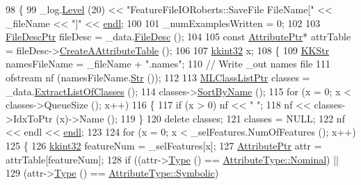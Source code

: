 \begin{DoxyCode}
98 \{
99   \_log.\hyperlink{class_k_k_b_1_1_run_log_a32cf761d7f2e747465fd80533fdbb659}{Level} (20) << \textcolor{stringliteral}{"FeatureFileIORoberts::SaveFile    FileName["} << \_fileName << \textcolor{stringliteral}{"]"} << 
      \hyperlink{namespace_k_k_b_ad1f50f65af6adc8fa9e6f62d007818a8}{endl};
100 
101   \_numExamplesWritten = 0;
102   
103   \hyperlink{class_k_k_m_l_l_1_1_file_desc}{FileDescPtr}  fileDesc = \_data.\hyperlink{class_k_k_m_l_l_1_1_feature_vector_list_a736923be9c4ac7553a5aa87dd24efd16}{FileDesc} ();
104 
105   \textcolor{keyword}{const} \hyperlink{class_k_k_m_l_l_1_1_attribute}{AttributePtr}*  attrTable = fileDesc->\hyperlink{class_k_k_m_l_l_1_1_file_desc_ab06cc9c9bd6ef17e487d5760ab4ff5f7}{CreateAAttributeTable} ();
106 
107   \hyperlink{namespace_k_k_b_a8fa4952cc84fda1de4bec1fbdd8d5b1b}{kkint32}  x;
108   \{
109     \hyperlink{class_k_k_b_1_1_k_k_str}{KKStr}  namesFileName = \_fileName + \textcolor{stringliteral}{".names"};
110     \textcolor{comment}{// Write \_out names file}
111     ofstream  nf (namesFileName.\hyperlink{class_k_k_b_1_1_k_k_str_ad574e6c0fe7f6ce1ba3ab0a8ce2fbd52}{Str} ());
112 
113     \hyperlink{class_k_k_m_l_l_1_1_m_l_class_list}{MLClassListPtr} classes = \_data.\hyperlink{class_k_k_m_l_l_1_1_feature_vector_list_af4bffa9713e7632b9e0e33f931528164}{ExtractListOfClasses} ();
114     classes->\hyperlink{class_k_k_m_l_l_1_1_m_l_class_list_a00b4e0ed01e65ca7e6c21c285ea45c02}{SortByName} ();
115     \textcolor{keywordflow}{for}  (x = 0;  x < classes->QueueSize ();  x++)
116     \{
117       \textcolor{keywordflow}{if}  (x > 0)  nf << \textcolor{stringliteral}{" "};
118       nf << classes->IdxToPtr (x)->Name ();
119     \}
120     \textcolor{keyword}{delete}  classes;
121     classes = NULL;
122     nf << endl << \hyperlink{namespace_k_k_b_ad1f50f65af6adc8fa9e6f62d007818a8}{endl};
123 
124     \textcolor{keywordflow}{for}  (x = 0;  x < \_selFeatures.NumOfFeatures ();  x++)
125     \{
126       \hyperlink{namespace_k_k_b_a8fa4952cc84fda1de4bec1fbdd8d5b1b}{kkint32}  featureNum = \_selFeatures[x];
127       \hyperlink{class_k_k_m_l_l_1_1_attribute}{AttributePtr}  attr = attrTable[featureNum];
128       \textcolor{keywordflow}{if}  ((attr->\hyperlink{class_k_k_m_l_l_1_1_attribute_ae867c1b4e264fb7be26941730364116d}{Type} () == \hyperlink{namespace_k_k_m_l_l_a99973706982b59debba670e2480555aba8c28d7c312116b8a46e2f466cb33d5b4}{AttributeType::Nominal})  ||
129            (attr->\hyperlink{class_k_k_m_l_l_1_1_attribute_ae867c1b4e264fb7be26941730364116d}{Type} () == \hyperlink{namespace_k_k_m_l_l_a99973706982b59debba670e2480555abaaddee1396a3e20ceea8071ed6da54866}{AttributeType::Symbolic})

\end{DoxyCode}
